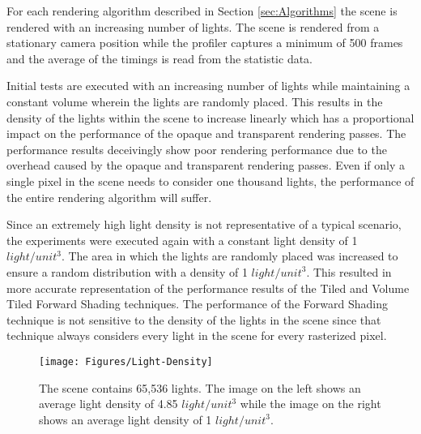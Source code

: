 For each rendering algorithm described in Section \ref{sec:Algorithms} the scene is rendered with an increasing number of lights. The scene is rendered from a stationary camera position while the profiler captures a minimum of 500 frames and the average of the timings is read from the statistic data.

Initial tests are executed with an increasing number of lights while maintaining a constant volume wherein the lights are randomly placed. This results in the density of the lights within the scene to increase linearly which has a proportional impact on the performance of the opaque and transparent rendering passes. The performance results deceivingly show poor rendering performance due to the overhead caused by the opaque and transparent rendering passes. Even if only a single pixel in the scene needs to consider one thousand lights, the performance of the entire rendering algorithm will suffer.

Since an extremely high light density is not representative of a typical scenario, the experiments were executed again with a constant light density of 1 $light/unit^3$. The area in which the lights are randomly placed was increased to ensure a random distribution with a density of 1 $light/unit^3$. This resulted in more accurate representation of the performance results of the Tiled and Volume Tiled Forward Shading techniques. The performance of the Forward Shading technique is not sensitive to the density of the lights in the scene since that technique always considers every light in the scene for every rasterized pixel.

\begin{figure}[H]
\centering
\texttt{[image: Figures/Light-Density]}
\decoRule
\caption{The scene contains 65,536 lights. The image on the left shows an average light density of 4.85 $light/unit^3$ while the image on the right shows an average light density of 1 $light/unit^3$. }
\label{fig:LightDensity}
\end{figure}
